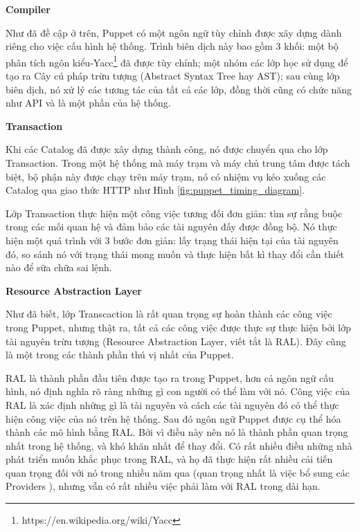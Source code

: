 \textbf{\large Compiler}


Như đã đề cập ở trên, Puppet có một ngôn ngữ tùy chỉnh được xây dựng dành riêng cho việc cấu hình hệ thống. Trình biên dịch này bao gồm 3 khối: một bộ phân tích ngôn kiểu-Yacc\footnote{https://en.wikipedia.org/wiki/Yacc} đã được tùy chỉnh; một nhóm các lớp học sử dụng để tạo ra Cây cú pháp trừu tượng (Abstract Syntax Tree hay AST); sau cùng lớp biên dịch, nó xử lý các tương tác của tất cả các lớp, đồng thời cũng có chức năng như API và là một phần của hệ thống.


\textbf{\large Transaction}


Khi các Catalog đã được xây dựng thành công, nó được chuyển qua cho lớp Transaction. Trong một hệ thống mà máy trạm và máy chủ trung tâm được tách biệt, bộ phận này được chạy trên máy trạm, nó có nhiệm vụ kéo xuống các Catalog qua giao thức HTTP như Hình \ref{fig:puppet_timing_diagram}.

Lớp Transaction thực hiện một công việc tương đối đơn giản: tìm sự rằng buộc trong các mối quan hệ và đảm bảo các tài nguyên đấy được đồng bộ. Nó thực hiện một quá trình với 3 bước đơn giản: lấy trạng thái hiện tại của tài nguyên đó, so sánh nó với trạng thái mong muốn và thực hiện bất kì thay đổi cần thiết nào để sữa chữa sai lệnh.


\textbf{\large Resource Abstraction Layer}


Như đã biết, lớp Transcaction là rất quan trọng sự hoàn thành các công việc trong Puppet, nhưng thật ra, tất cả các công việc được thực sự thực hiện bởi lớp tài nguyên trừu tượng (Resource Abstraction Layer, viết tắt là RAL). Đây cũng là một trong các thành phần thú vị nhất của Puppet.

RAL là thành phần đầu tiên được tạo ra trong Puppet, hơn cả ngôn ngữ cấu hình, nó định nghĩa rõ ràng những gì con người có thể làm với nó. Công việc của RAL là xác định những gì là tài nguyên và cách các tài nguyên đó có thể thực hiện công việc của nó trên hệ thống. Sau đó ngôn ngữ Puppet được cụ thể hóa thành các mô hình bằng RAL. Bởi vì điều này nên nó là thành phần quan trọng nhất trong hệ thống, và khó khăn nhất để thay đổi. Có rất nhiều điều những nhà phát triển muốn khắc phục trong RAL, và họ đã thực hiện rất nhiều cải tiến quan trọng đối với nó trong nhiều năm qua (quan trọng nhất là việc bổ sung các Providers ), nhưng vẫn có rất nhiều việc phải làm với RAL trong dài hạn.

